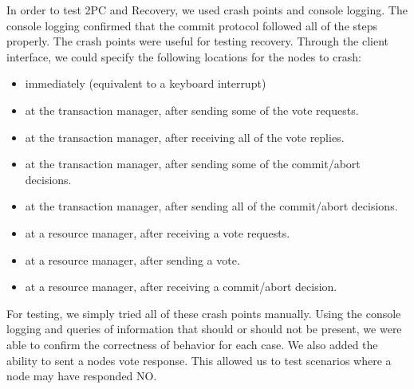 \documentclass[11pt]{article}
\begin{document}
In order to test 2PC and Recovery, we used crash points and console logging. The console logging confirmed that the commit protocol followed all of the steps properly. The crash points were useful for testing recovery. Through the client interface, we could specify the following locations for the nodes to crash:
\begin{itemize}
\item immediately (equivalent to a keyboard interrupt)
\item at the transaction manager, after sending some of the vote requests.
\item at the transaction manager, after receiving all of the vote replies.
\item at the transaction manager, after sending some of the commit/abort decisions.
\item at the transaction manager, after sending all of the commit/abort decisions.
\item at a resource manager, after receiving a vote requests.
\item at a resource manager, after sending a vote.
\item at a resource manager, after receiving a commit/abort decision.
\end{itemize}
For testing, we simply tried all of these crash points manually. Using the console logging and queries of information that should or should not be present, we were able to confirm the correctness of behavior for each case. We also added the ability to sent a nodes vote response. This allowed us to test scenarios where a node may have responded NO.\par
\end{document}
